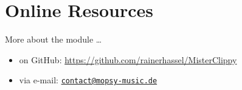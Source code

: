 \documentclass[a4paper,
               11pt,
               parskip=half,
               headinclude,
               titlepage=false]{scrartcl}
\begin{document}
\section*{Online Resources}

More about the module  …
\begin{itemize}[noitemsep]
 \item on GitHub: \url{https://github.com/rainerhassel/MisterClippy}
 \item via e-mail: \href{mailto:contact@mopsy-music.de}{\texttt{contact@mopsy-music.de}}
\end{itemize}
\end{document}
